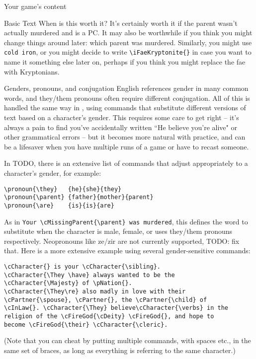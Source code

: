 \documentclass{article}
\begin{document}
\begin{section}{Your game's content}
\begin{subsection}{Basic \gametex{} Text}
When is this worth it?  It's certainly worth it if the parent wasn't actually murdered and is a PC.  It may also be worthwhile if you think you might change things around later: which parent was murdered.  Similarly, you might use \lstinline|cold iron|, or you might decide to write \lstinline|\iFaeKryptonite{}| in case you want to name it something else later on, perhaps if you think you might replace the fae with Kryptonians.
\end{subsection}
\begin{subsection}{Genders, pronouns, and conjugation}
English references gender in many common words, and they/them pronouns often require different conjugation.  All of this is handled the same way in \gametex{}, using commands that substitute different versions of text based on a character's gender.  This requires some care to get right – it's always a pain to find you've accidentally written ``He believe you're alive" or other grammatical errors – but it becomes more natural with practice, and can be a lifesaver when you have multiple runs of a game or have to recast someone.

In TODO, there is an extensive list of commands that adjust appropriately to a character's gender, for example:
\begin{verbatim}
\pronoun{\they}   {he}{she}{they}
\pronoun{\parent} {father}{mother}{parent}
\pronoun{\are}    {is}{is}{are}
\end{verbatim}

As in \lstinline|Your \cMissingParent{\parent} was murdered|, this defines the word to substitute when the character is male, female, or uses they/them pronouns respectively.  Neopronouns like ze/zir are not currently supported, TODO: fix that.
Here is a more extensive example using several gender-sensitive commands:

\begin{verbatim}
\cCharacter{} is your \cCharacter{\sibling}.
\cCharacter{\They \have} always wanted to be the
\cCharacter{\Majesty} of \pNation{}.  
\cCharacter{\They\re} also madly in love with their 
\cPartner{\spouse}, \cPartner{}, the \cPartner{\child} of 
\cInLaw{}. \cCharacter{\They} believe\cCharacter{\verbs} in the 
religion of the \cFireGod{\cDeity} \cFireGod{}, and hope to 
become \cFireGod{\their} \cCharacter{\cleric}.
\end{verbatim}

(Note that you can cheat by putting multiple commands, with spaces etc., in the same set of braces, as long as everything is referring to the same character.)


\end{subsection}
\end{section}
\end{document}
